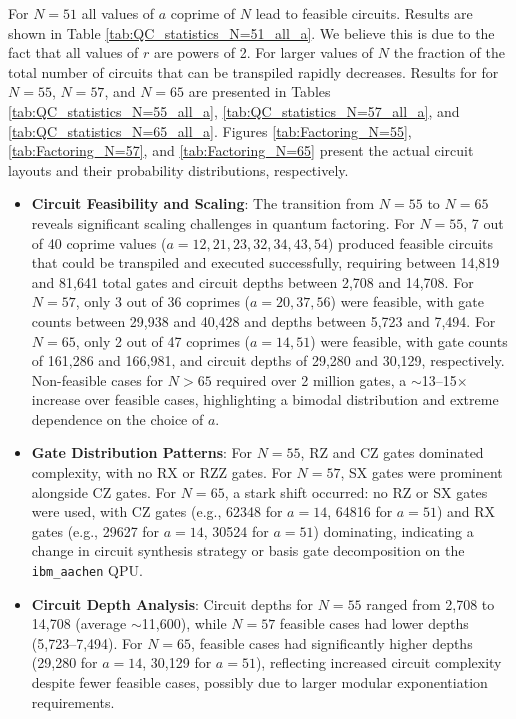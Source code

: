 \documentclass[conference,twoside]{IEEEtran}
\begin{document}
 For $N=51$ all values of $a$ coprime of $N$ lead to feasible circuits. Results are shown in Table \ref{tab:QC_statistics_N=51_all_a}. We believe this is due to the fact that all values of $r$ are powers of 2. For larger values of $N$ the fraction of the total number of circuits that can be transpiled rapidly decreases. Results for for $N=55$, $N=57$, and $N=65$ are presented in Tables \ref{tab:QC_statistics_N=55_all_a}, \ref{tab:QC_statistics_N=57_all_a}, and \ref{tab:QC_statistics_N=65_all_a}. Figures \ref{tab:Factoring_N=55}, \ref{tab:Factoring_N=57}, and \ref{tab:Factoring_N=65} present the actual circuit layouts and their probability distributions, respectively. 

\begin{itemize}
    \item \textbf{Circuit Feasibility and Scaling}: The transition from $N=55$ to $N=65$ reveals significant scaling challenges in quantum factoring. For $N=55$, 7 out of 40 coprime values ($a = 12, 21, 23, 32, 34, 43, 54$) produced feasible circuits that could be transpiled and executed successfully, requiring between 14,819 and 81,641 total gates and circuit depths between 2,708 and 14,708. For $N=57$, only 3 out of 36 coprimes ($a = 20, 37, 56$) were feasible, with gate counts between 29,938 and 40,428 and depths between 5,723 and 7,494. For $N=65$, only 2 out of 47 coprimes ($a = 14, 51$) were feasible, with gate counts of 161,286 and 166,981, and circuit depths of 29,280 and 30,129, respectively. Non-feasible cases for $N>65$ required over 2 million gates, a $\sim$13--15$\times$ increase over feasible cases, highlighting a bimodal distribution and extreme dependence on the choice of $a$.

    \item \textbf{Gate Distribution Patterns}: For $N=55$, RZ and CZ gates dominated complexity, with no RX or RZZ gates. For $N=57$, SX gates were prominent alongside CZ gates. For $N=65$, a stark shift occurred: no RZ or SX gates were used, with CZ gates (e.g., 62348 for $a=14$, 64816 for $a=51$) and RX gates (e.g., 29627 for $a=14$, 30524 for $a=51$) dominating, indicating a change in circuit synthesis strategy or basis gate decomposition on the \texttt{ibm\_aachen} QPU.

    \item \textbf{Circuit Depth Analysis}: Circuit depths for $N=55$ ranged from 2,708 to 14,708 (average $\sim$11,600), while $N=57$ feasible cases had lower depths (5,723--7,494). For $N=65$, feasible cases had significantly higher depths (29,280 for $a=14$, 30,129 for $a=51$), reflecting increased circuit complexity despite fewer feasible cases, possibly due to larger modular exponentiation requirements.


\end{itemize}
\end{document}
